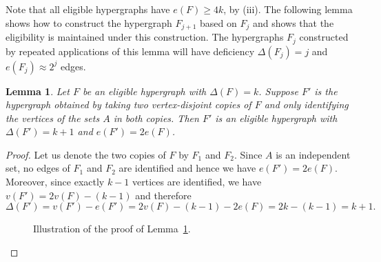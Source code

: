 \documentclass[11pt]{article}
\numberwithin{equation}{section}
\theoremstyle{plain}
\newtheorem{lemma}[theorem]{Lemma}
\theoremstyle{remark}
\begin{document}
\noindent
Note that all eligible hypergraphs have $e(F)\geq 4k$, by (iii). The following lemma shows how to construct the hypergraph $F_{j+1}$ based on $F_j$ and shows that the eligibility is maintained under this construction. The hypergraphs $F_j$ constructed by repeated applications of this lemma will have deficiency $\Delta(F_j)=j$ and $e(F_j)\approx 2^j$ edges.

\begin{lemma}\label{lemma:maintaining eligibility}
Let $F$ be an eligible hypergraph with $\Delta(F)=k$. Suppose $F'$ is the hypergraph obtained by taking two vertex-disjoint copies of $F$ and only identifying the vertices of the sets $A$ in both copies. Then $F'$ is an eligible hypergraph with $\Delta(F')=k+1$ and $e(F')=2e(F)$.
\end{lemma}
\begin{proof}
Let us denote the two copies of $F$ by $F_1$ and $F_2$. Since $A$ is an independent set, no edges of $F_1$ and $F_2$ are identified and hence we have $e(F')=2e(F)$. Moreover, since exactly $k-1$ vertices are identified, we have $v(F')=2v(F)-(k-1)$ and therefore \[\Delta(F')=v(F')-e(F')=2v(F)-(k-1)-2e(F)=2k-(k-1)=k+1.\]

\begin{figure}[h!]
    \centering
    \caption{Illustration of the proof of Lemma~\ref{lemma:maintaining eligibility}.}
\end{figure}


\end{proof}
\end{document}
